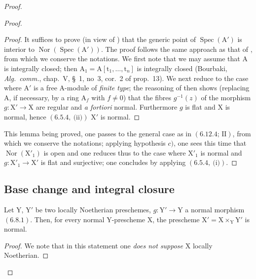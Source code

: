 \begin{proof}
\begin{proof}
\begin{proof}
It suffices to prove (in view of ) that the generic point of $\operatorname{Spec}(\mathrm{A}')$ is interior to
$\operatorname{Nor}(\operatorname{Spec}(\mathrm{A}'))$. The proof follows the same approach as that of , from which we conserve the notations.
We first note that we may assume that $\mathrm{A}$ is integrally closed; then $\mathrm{A}_1=\mathrm{A}[\mathrm{t}_1,\ldots,\mathrm{t}_n]$
is integrally closed (Bourbaki, \emph{Alg.~comm.}, chap.~V, \S~1, no~3, cor.~2 of prop.~13). We next reduce to the
case where $\mathrm{A}'$ is a free $\mathrm{A}$-module of \emph{finite type}; the reasoning of  then shows
(replacing $\mathrm{A}$, if necessary, by a ring $\mathrm{A}_f$ with $f\neq 0$) that the fibres $g^{-1}(z)$
of the morphism $g:\mathrm{X}'\to\mathrm{X}$ are regular and \emph{a fortiori} normal.
Furthermore $g$ is flat and $\mathrm{X}$ is normal, hence $(6.5.4,~\text{(ii)})$ $\mathrm{X}'$ is normal.
\end{proof}

This lemma being proved, one passes to the general case as in $(\text{6.12.4; II})$, from which we conserve the
notations; applying hypothesis $c)$, one sees this time that $\operatorname{Nor}(\mathrm{X}'_1)$ is open and one reduces thus to the case
where $\mathrm{X}'_1$ is normal and $g:\mathrm{X}'_1\to\mathrm{X}'$ is flat and surjective; one concludes by applying $(6.5.4,~\text{(i)})$.
\end{proof}

\subsection{Base change and integral closure}
\label{subsection:IV.6.14}

\begin{proposition}[6.14.1]
\label{IV.6.14.1}
Let $\mathrm{Y}$, $\mathrm{Y}'$ be two locally Noetherian preschemes, $g:\mathrm{Y}'\to\mathrm{Y}$
a normal morphism $(6.8.1)$. Then, for every normal $\mathrm{Y}$-prescheme $\mathrm{X}$, the prescheme $\mathrm{X}'=\mathrm{X}\times_\mathrm{Y}\mathrm{Y}'$
is normal.
\end{proposition}

\begin{proof}
We note that in this statement one \emph{does not suppose} $\mathrm{X}$ locally Noetherian.
\end{proof}


\end{proof}

